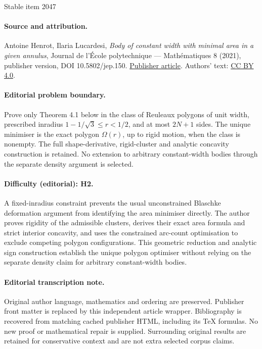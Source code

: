 \documentclass[11pt]{article}
\numberwithin{equation}{section}
\theoremstyle{plain}
\theoremstyle{definition}
\begin{document}
\begin{center}{\Large Stable item 2047}\end{center}
\paragraph{Source and attribution.}
Antoine Henrot, Ilaria Lucardesi, \emph{Body of constant width with minimal area in a given annulus}, Journal de l’École polytechnique — Mathématiques 8 (2021), publisher version, DOI 10.5802/jep.150. \href{https://jep.centre-mersenne.org/articles/10.5802/jep.150/}{Publisher article}. Authors' text: \href{https://creativecommons.org/licenses/by/4.0/}{CC BY 4.0}.
\paragraph{Editorial problem boundary.}
Prove only Theorem 4.1 below in the class of Reuleaux polygons of unit width, prescribed inradius \(1-1/\sqrt3\le r<1/2\), and at most \(2N+1\) sides. The unique minimiser is the exact polygon \(\Omega(r)\), up to rigid motion, when the class is nonempty. The full shape-derivative, rigid-cluster and analytic concavity construction is retained. No extension to arbitrary constant-width bodies through the separate density argument is selected.
\paragraph{Difficulty (editorial): H2.}
A fixed-inradius constraint prevents the usual unconstrained Blaschke deformation argument from identifying the area minimiser directly. The author proves rigidity of the admissible clusters, derives their exact area formula and strict interior concavity, and uses the constrained arc-count optimisation to exclude competing polygon configurations. This geometric reduction and analytic sign construction establish the unique polygon optimiser without relying on the separate density claim for arbitrary constant-width bodies.
\paragraph{Editorial transcription note.}
Original author language, mathematics and ordering are preserved. Publisher front matter is replaced by this independent article wrapper. Bibliography is recovered from matching cached publisher HTML, including its TeX formulas. No new proof or mathematical repair is supplied. Surrounding original results are retained for conservative context and are not extra selected corpus claims.
\clearpage
\end{document}
